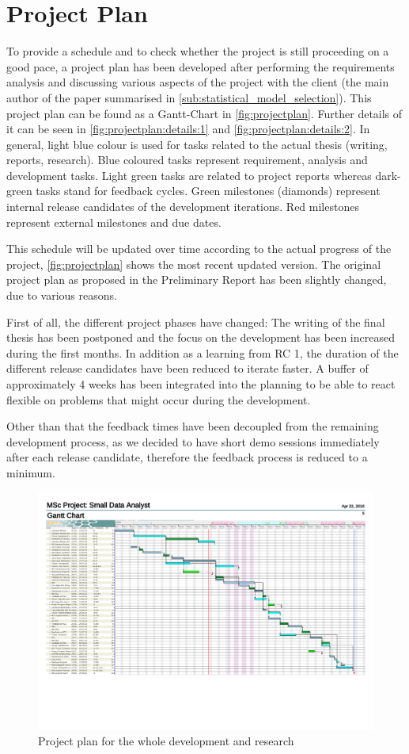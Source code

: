 \section{Project Plan}
\label{sec:projectplan}
To provide a schedule and to check whether the project is still proceeding on a good pace, a project plan has been developed after performing the requirements analysis and discussing various aspects of the project with the client (the main author of the paper summarised in \autoref{sub:statistical_model_selection}). This project plan can be found as a Gantt-Chart in \autoref{fig:projectplan}. Further details of it can be seen in \autoref{fig:projectplan:details:1} and \autoref{fig:projectplan:details:2}. In general, light blue colour is used for tasks related to the actual thesis (writing, reports, research). Blue coloured tasks represent requirement, analysis and development tasks. Light green tasks are related to project reports whereas dark-green tasks stand for feedback cycles. Green milestones (diamonds) represent internal release candidates of the development iterations. Red milestones represent external milestones and due dates. 

This schedule will be updated over time according to the actual progress of the project, \autoref{fig:projectplan} shows the most recent updated version. 
The original project plan as proposed in the Preliminary Report has been slightly changed, due to various reasons. 

First of all, the different project phases have changed: The writing of the final thesis has been postponed and the focus on the development has been increased during the first months. In addition as a learning from RC 1, the duration of the different release candidates have been reduced to iterate faster. A buffer of approximately 4 weeks has been integrated into the planning to be able to react flexible on problems that might occur during the development. 

Other than that the feedback times have been decoupled from the remaining development process, as we decided to have short demo sessions immediately after each release candidate, therefore the feedback process is reduced to a minimum.

\begin{figure}
	\centering
	\includegraphics[width=\textwidth]{appendix/Projectplan}
	\caption{Project plan for the whole development and research}
	\label{fig:projectplan}
\end{figure}
\restoregeometry